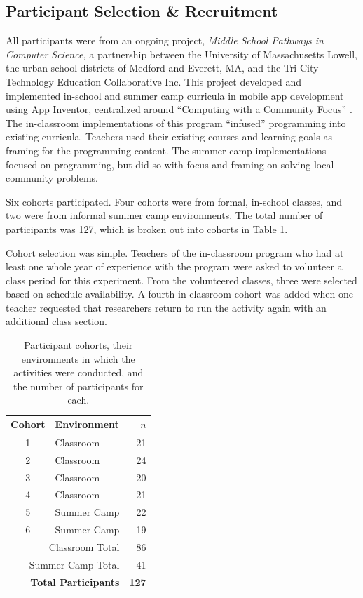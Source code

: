 \subsection{Participant Selection \& Recruitment} 

All participants were from an ongoing project, \emph{Middle School Pathways in Computer Science,} a partnership between the University of Massachusetts Lowell, the urban school districts of Medford and Everett, MA, and the Tri-City Technology Education Collaborative Inc. This project developed and implemented in-school and summer camp curricula in mobile app development using App Inventor, centralized around ``Computing with a Community Focus'' \citep{Ni-2016}. The in-classroom implementations of this program ``infused'' programming into existing curricula. Teachers used their existing courses and learning goals as framing for the programming content. \label{sec:infusion} The summer camp implementations focused on programming, but did so with focus and framing on solving local community problems.

Six cohorts participated. Four cohorts were from formal, in-school classes, and two were from informal summer camp environments. The total number of participants was 127, which is broken out into cohorts in Table \ref{tab:cohorts}.

Cohort selection was simple. Teachers of the in-classroom program who had at least one whole year of experience with the program were asked to volunteer a class period for this experiment. From the volunteered classes, three were selected based on schedule availability. A fourth in-classroom cohort was added when one teacher requested that researchers return to run the activity again with an additional class section.

\begin{table}
\begin{centering}
	\begin{tabular}{clr}
	Cohort & Environment & $n$ \\
	\hline
	1 & Classroom & 21		\\
	2 & Classroom & 24		\\
	3 & Classroom & 20		\\
	4 & Classroom & 21		\\
	5 & Summer Camp & 22	\\
	6 & Summer Camp & 19	\\ \hline
	\multicolumn{2}{r}{Classroom Total} & 86 \\
	\multicolumn{2}{r}{Summer Camp Total} & 41 \\ \hline \hline
	\multicolumn{2}{r}{\textbf{Total Participants}} & \textbf{127} \\ 
	
	\end{tabular}
	\caption[Participant cohorts]{Participant cohorts, their environments in which the activities were conducted, and the number of participants for each.}
	\label{tab:cohorts}
\end{centering}
\end{table}


